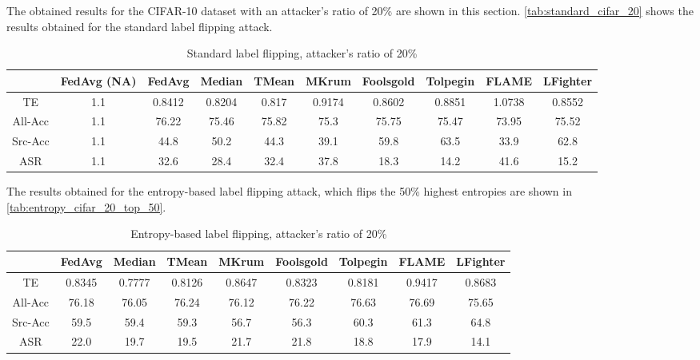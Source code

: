 The obtained results for the CIFAR-10 dataset with an attacker's ratio of 20\% are shown in this section.
\autoref{tab:standard_cifar_20} shows the results obtained for the standard label flipping attack.

\begin{table}[h!]
        \centering
        \small
        \begin{adjustbox}{center}
        \begin{tabular}{|c|c|c|c|c|c|c|c|c|c|}
                \hline
                & FedAvg (NA) & FedAvg & Median & TMean & MKrum & Foolsgold & Tolpegin & FLAME & LFighter \\
                \hline
                TE & 1.1 & 0.8412 & 0.8204 & 0.817 & 0.9174 & 0.8602 & 0.8851 & 1.0738 & 0.8552 \\
                \hline
                All-Acc & 1.1 & 76.22 & 75.46 & 75.82 & 75.3 & 75.75 & 75.47 & 73.95 & 75.52 \\
                \hline
                Src-Acc & 1.1 & 44.8 & 50.2 & 44.3 & 39.1 & 59.8 & 63.5 & 33.9 & 62.8 \\
                \hline
                ASR & 1.1 & 32.6 & 28.4 & 32.4 & 37.8 & 18.3 & 14.2 & 41.6 & 15.2 \\
                \hline
        \end{tabular}
        \end{adjustbox}
        \caption{Standard label flipping, attacker's ratio of 20\%}
        \label{tab:standard_cifar_20}
    \end{table}
    
The results obtained for the entropy-based label flipping attack, which flips the 50\% highest entropies are shown in \autoref{tab:entropy_cifar_20_top_50}.

\begin{table}[h!]
        \centering
        \small
        \begin{adjustbox}{center}
        \begin{tabular}{|c|c|c|c|c|c|c|c|c|}
            \hline
            & FedAvg & Median & TMean & MKrum & Foolsgold & Tolpegin & FLAME & LFighter \\
            \hline
            TE & 0.8345 & 0.7777 & 0.8126 & 0.8647 & 0.8323 & 0.8181 & 0.9417 & 0.8683 \\
            \hline
            All-Acc & 76.18 & 76.05 & 76.24 & 76.12 & 76.22 & 76.63 & 76.69 & 75.65 \\
            \hline
            Src-Acc & 59.5 & 59.4 & 59.3 & 56.7 & 56.3 & 60.3 & 61.3 & 64.8 \\
            \hline
            ASR & 22.0 & 19.7 & 19.5 & 21.7 & 21.8 & 18.8 & 17.9 & 14.1 \\
            \hline
        \end{tabular}
        \end{adjustbox}
        \caption{Entropy-based label flipping, attacker's ratio of 20\%}
        \label{tab:entropy_cifar_20_top_50}
    \end{table}
    

